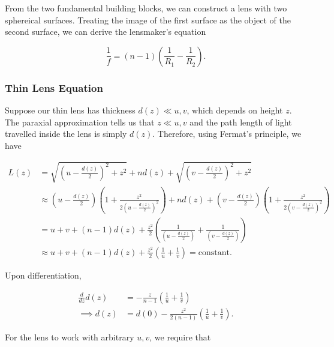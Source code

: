 \documentclass[english,a4paper,12pt]{report}
\begin{document}
From the two fundamental building blocks, we can construct a lens with two sphereical surfaces. Treating the image of the first surface as the object of the second surface, we can derive the lensmaker's equation 

\begin{equation}
    \frac{1}{f} = (n-1) \left(\frac{1}{R_1 } - \frac{1}{R_2 }\right).  
\end{equation}

\subsubsection{Thin Lens Equation}

Suppose our thin lens has thickness \(d(z) \ll  u,v \), which depends on height \(z\). The paraxial approximation tells us that \(z \ll  u,v\) and the path length of light travelled inside the lens is simply \(d(z)\). Therefore, using Fermat's principle, we have

\begin{equation}
    \begin{aligned} 
    L(z) &= \sqrt{\left(u-\frac{d(z)}{2}\right) ^2+z^2} + nd(z) + \sqrt{\left( v-\frac{d(z)}{2}  \right)^2+z^2} \\
    &\approx  \left( u- \frac{d(z)}{2}  \right) \left( 1 + \frac{z^2}{2\left( u - \frac{d(z)}{2}  \right)^2}  \right) + nd(z) + \left( v- \frac{d(z)}{2}  \right) \left( 1 + \frac{z^2}{2\left( v - \frac{d(z)}{2}  \right)^2}  \right) \\
    &= u + v + (n-1) d(z) + \frac{z^2}{2} \left( \frac{1}{\left( u-\frac{d(z)}{2}  \right)} + \frac{1}{\left( v-\frac{d(z)}{2}  \right)}  \right) \\
    &\approx u+v+(n-1)d(z) + \frac{z^2}{2}\left(\frac{1}{u} + \frac{1}{v}  \right) = \text{constant}.  
    \end{aligned} 
\end{equation}

Upon differentiation, 

\begin{equation}
    \begin{aligned} 
    \frac{d}{dz}d(z) &= -\frac{z}{n-1}\left(\frac{1}{u} + \frac{1}{v}  \right) \\
    \implies  d(z) &= d(0) - \frac{z^2}{2(n-1)} \left( \frac{1}{u} + \frac{1}{v}   \right).   
    \end{aligned} 
\end{equation}

For the lens to work with arbitrary \(u, v\), we require that 
\end{document}
